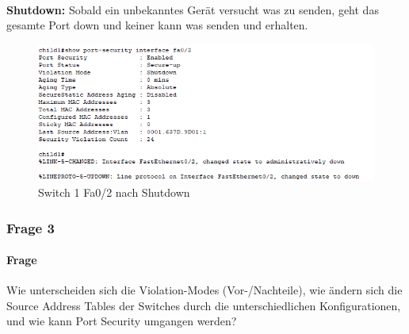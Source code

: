 \\
\textbf{Shutdown:} Sobald ein unbekanntes Gerät versucht was zu senden, geht das gesamte Port down und keiner kann was senden und erhalten.
\begin{figure}[!htb]
    \centering
    \includegraphics[width=.95\textwidth,keepaspectratio]{./img/config/max address/shutdown.png}
    \caption{Switch 1 Fa0/2 nach Shutdown}
\end{figure}
\FloatBarrier
\clearpage
\pagebreak
\subsubsection{Frage 3}
\paragraph{Frage}
Wie unterscheiden sich die Violation-Modes (Vor-/Nachteile), wie
ändern sich die Source Address Tables der Switches durch die unterschiedlichen
Konfigurationen, und wie kann Port Security umgangen werden?
